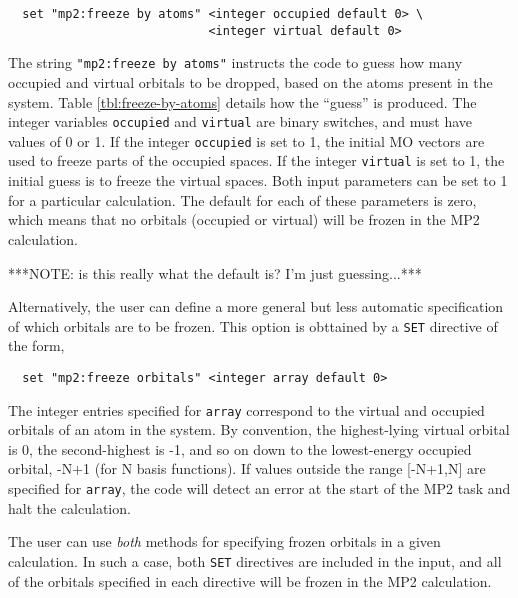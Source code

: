 \begin{verbatim}
  set "mp2:freeze by atoms" <integer occupied default 0> \
                            <integer virtual default 0>
\end{verbatim}

The string \verb+"mp2:freeze by atoms"+ instructs the code to guess how 
many occupied and virtual orbitals to be dropped, based on the atoms
present in the system.  Table \ref{tbl:freeze-by-atoms} details how
the ``guess'' is produced.  The integer variables \verb+occupied+ and
\verb+virtual+ are binary switches, and must have values of 0 or 1.  If
the integer \verb+occupied+ is set to 1, the initial MO vectors are
used to freeze parts of the occupied spaces.  If the integer \verb+virtual+
is set to 1, the initial guess is to freeze the virtual spaces.  Both 
input parameters can be set to 1 for a particular calculation.  The default
for each of these parameters is zero, which means that no orbitals (occupied
or virtual) will be frozen in the MP2 calculation. 

\Large
***NOTE: is this really what the default is?  I'm just guessing...***
\normalsize

Alternatively, the user can define a more general but less automatic
specification of which orbitals are to be frozen.  This option is 
obttained by a \verb+SET+ directive of the form,

\begin{verbatim}
  set "mp2:freeze orbitals" <integer array default 0>
\end{verbatim}

The integer entries specified for \verb+array+ correspond to the virtual
and occupied orbitals of an atom in the system.  By convention, the 
highest-lying virtual orbital is 0, the second-highest is -1, and so on
down to the lowest-energy occupied orbital, -N+1 (for N basis functions).
If values outside the range [-N+1,N] are specified for \verb+array+,
the code will detect an error at the start of the MP2 task and
halt the calculation.

The user can use {\em both} methods for specifying frozen orbitals in a
given calculation.  In such a case, both \verb+SET+ directives are
included in the input, and all of the orbitals specified in each
directive will be frozen in the MP2 calculation.


